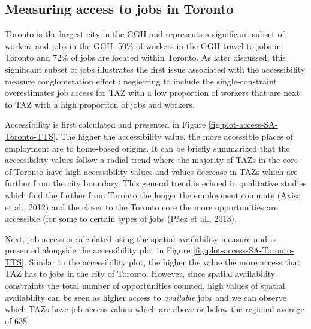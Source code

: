 \documentclass[]{elsarticle} %
\begin{document}
\hypertarget{measuring-access-to-jobs-in-toronto}{%
\subsection{Measuring access to jobs in
Toronto}\label{measuring-access-to-jobs-in-toronto}}

Toronto is the largest city in the GGH and represents a significant
subset of workers and jobs in the GGH; 50\% of workers in the GGH travel
to jobs in Toronto and 72\% of jobs are located within Toronto. As later
discussed, this significant subset of jobs illustrates the first issue
associated with the accessibility measure conglomeration effect :
neglecting to include the single-constraint overestimates job access for
TAZ with a low proportion of workers that are next to TAZ with a high
proportion of jobs and workers.

Accessibility is first calculated and presented in Figure
\ref{fig:plot-access-SA-Toronto-TTS}. The higher the accessibility
value, the more accessible places of employment are to home-based
origins. It can be briefly summarized that the accessibility values
follow a radial trend where the majority of TAZs in the core of Toronto
have high accessibility values and values decrease in TAZs which are
further from the city boundary. This general trend is echoed in
qualitative studies which find the further from Toronto the longer the
employment commute (Axisa et al., 2012) and the closer to the Toronto
core the more opportunities are accessible (for some to certain types of
jobs (Páez et al., 2013).

Next, job access is calculated using the spatial availability measure
and is presented alongside the accessibility plot in Figure
\ref{fig:plot-access-SA-Toronto-TTS}. Similar to the accessibility plot,
the higher the value the more access that TAZ has to jobs in the city of
Toronto. However, since spatial availability constraints the total
number of opportunities counted, high values of spatial availability can
be seen as higher access to \emph{available} jobs and we can observe
which TAZs have job access values which are above or below the regional
average of 638.
\end{document}
